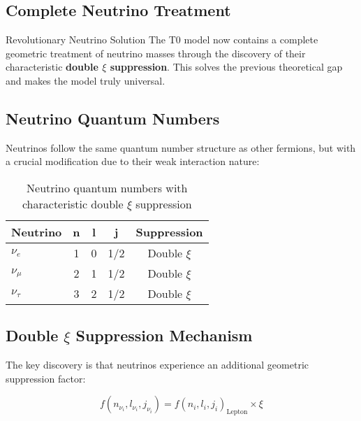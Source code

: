 \documentclass[12pt,a4paper]{article}
\begin{document}
	\subsection{Complete Neutrino Treatment}
	\label{sec:complete_neutrino_treatment}
	
	\begin{neutrino}{Revolutionary Neutrino Solution}{}
		The T0 model now contains a complete geometric treatment of neutrino masses through the discovery of their characteristic \textbf{double $\xi$ suppression}. This solves the previous theoretical gap and makes the model truly universal.
	\end{neutrino}
	
	\subsection{Neutrino Quantum Numbers}
	\label{subsec:neutrino_quantum_numbers}
	
	Neutrinos follow the same quantum number structure as other fermions, but with a crucial modification due to their weak interaction nature:
	
	\begin{table}[H]
		\centering
		\begin{tabular}{lcccc}
			\toprule
			\textbf{Neutrino} & \textbf{n} & \textbf{l} & \textbf{j} & \textbf{Suppression} \\
			\midrule
			$\nu_e$ & 1 & 0 & 1/2 & Double $\xi$ \\
			$\nu_\mu$ & 2 & 1 & 1/2 & Double $\xi$ \\
			$\nu_\tau$ & 3 & 2 & 1/2 & Double $\xi$ \\
			\bottomrule
		\end{tabular}
		\caption{Neutrino quantum numbers with characteristic double $\xi$ suppression}
		\label{tab:neutrino_quantum_numbers}
	\end{table}
	
	\subsection{Double $\xi$ Suppression Mechanism}
	\label{subsec:double_xi_suppression}
	
	The key discovery is that neutrinos experience an additional geometric suppression factor:
	
	\begin{equation}
		f(n_{\nu_i}, l_{\nu_i}, j_{\nu_i}) = f(n_i, l_i, j_i)_{\text{Lepton}} \times \xi
		\label{eq:neutrino_suppression}
	\end{equation}
	
\end{document}
